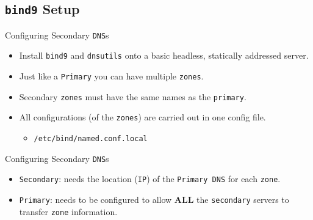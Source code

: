 \documentclass[xcolor=table]{beamer}
\begin{document}
\subsection{\texttt{bind9} Setup}
\begin{frame}{Configuring Secondary \texttt{DNS}s}
  \begin{itemize}
    \item Install \texttt{bind9} and \texttt{dnsutils} onto a basic headless, statically addressed server.
    \item Just like a \texttt{Primary} you can have multiple \texttt{zones}.
    \item Secondary \texttt{zones} must have the same names as the \texttt{primary}.
    \item All configurations (of the \texttt{zones}) are carried out in one config file.
      \begin{itemize}
        \item \texttt{/etc/bind/named.conf.local}
      \end{itemize}
  \end{itemize}
\end{frame}

\begin{frame}{Configuring Secondary \texttt{DNS}s}
  \begin{itemize}
    \item \texttt{Secondary}: needs the location (\texttt{IP}) of the \texttt{Primary DNS} for each \texttt{zone}.
    \item \texttt{Primary}: needs to be configured to allow \textbf{ALL} the \texttt{secondary} servers to transfer \texttt{zone} information.
  \end{itemize}
\end{frame}
\end{document}
